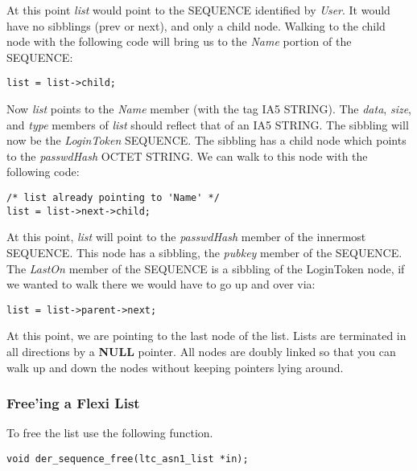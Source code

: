 \documentclass[synpaper]{book}
\begin{document}
At this point \textit{list} would point to the SEQUENCE identified by \textit{User}.  It would have no sibblings (prev or next), and only a child node.  Walking to the child
node with the following code will bring us to the \textit{Name} portion of the SEQUENCE:
\begin{small}
\begin{verbatim}
list = list->child;
\end{verbatim}
\end{small}
Now \textit{list} points to the \textit{Name} member (with the tag IA5 STRING).  The \textit{data}, \textit{size}, and \textit{type} members of \textit{list} should reflect
that of an IA5 STRING.  The sibbling will now be the \textit{LoginToken} SEQUENCE.  The sibbling has a child node which points to the \textit{passwdHash} OCTET STRING.
We can walk to this node with the following code:
\begin{small}
\begin{verbatim}
/* list already pointing to 'Name' */
list = list->next->child;
\end{verbatim}
\end{small}
At this point, \textit{list} will point to the \textit{passwdHash} member of the innermost SEQUENCE.  This node has a sibbling, the \textit{pubkey} member of the SEQUENCE.
The \textit{LastOn} member of the SEQUENCE is a sibbling of the LoginToken node, if we wanted to walk there we would have to go up and over via:
\begin{small}
\begin{verbatim}
list = list->parent->next;
\end{verbatim}
\end{small}
At this point, we are pointing to the last node of the list.  Lists are terminated in all directions by a \textbf{NULL} pointer.  All nodes are doubly linked so that you
can walk up and down the nodes without keeping pointers lying around.





\subsubsection{Free'ing a Flexi List}
To free the list use the following function.

\begin{verbatim}
void der_sequence_free(ltc_asn1_list *in);
\end{verbatim}
\end{document}
